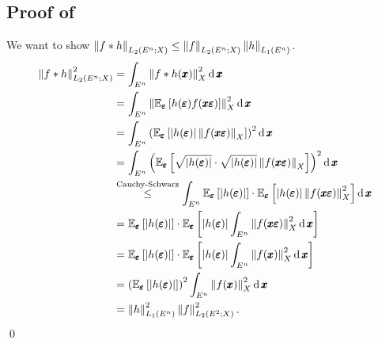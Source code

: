 \subsection{Proof of }\label{proof:1}
We want to show $\displaystyle \left\lVert f\ast h \right\rVert_{L_{2}(E^{n};X)} \le \left\lVert f \right\rVert_{L_{2}(E^{n};X)}\left\lVert h \right\rVert_{L_{1}(E^{n})}$.
\begin{align*}
\left\lVert f\ast h \right\rVert_{L_{2}(E^{n};X)}^{2} &= \int_{E^{n}} \left\lVert f\ast h(\pmb x) \right\rVert_{X}^{2}\operatorname{d}\pmb x\\
&= \int_{E^{n}} \left\lVert \mathbb E_{\pmb{\varepsilon}}\left[h(\pmb{\varepsilon})f(\pmb x\pmb{\varepsilon})\right] \right\rVert_{X}^{2}\operatorname{d}\pmb x\\
&= \int_{E^{n}} \left(\mathbb E_{\pmb{\varepsilon}}\left[\left| h(\pmb{\varepsilon}) \right|\left\lVert f(\pmb x\pmb{\varepsilon}) \right\rVert_{X}\right]\right)^{2}\operatorname{d}\pmb x\\
&= \int_{E^{n}} \left(\mathbb E_{\pmb{\varepsilon}}\left[\sqrt{\left| h(\pmb{\varepsilon}) \right|}\cdot \sqrt{\left| h(\pmb{\varepsilon}) \right|}\left\lVert f(\pmb x\pmb{\varepsilon}) \right\rVert_{X}\right]\right)^{2}\operatorname{d}\pmb x\\
&\stackrel{\text{Cauchy-Schwarz}}{\le} 
\int_{E^{n}} \mathbb E_{\pmb{\varepsilon}}\left[\left| h(\pmb{\varepsilon}) \right|\right]\cdot \mathbb E_{\pmb{\varepsilon}}\left[\left| h(\pmb{\varepsilon}) \right|\left\lVert f(\pmb x\pmb{\varepsilon}) \right\rVert_{X}^{2}\right]\operatorname{d}\pmb x\\
&= \mathbb E_{\pmb{\varepsilon}}\left[\left| h(\pmb{\varepsilon}) \right|\right]\cdot \mathbb E_{\pmb{\varepsilon}}\left[\left| h(\pmb{\varepsilon}) \right|\int_{E^{n}}\left\lVert f(\pmb x\pmb{\varepsilon}) \right\rVert_{X}^{2}\operatorname{d}\pmb x\right]\\
&= \mathbb E_{\pmb{\varepsilon}}\left[\left| h(\pmb{\varepsilon}) \right|\right]\cdot \mathbb E_{\pmb{\varepsilon}}\left[\left| h(\pmb{\varepsilon}) \right|\int_{E^{n}}\left\lVert f(\pmb x) \right\rVert_{X}^{2}\operatorname{d}\pmb x\right]\\
&= \left(\mathbb E_{\pmb{\varepsilon}}\left[\left| h(\pmb{\varepsilon}) \right|\right]\right)^{2} \int_{E^{n}}\left\lVert f(\pmb x) \right\rVert_{X}^{2}\operatorname{d}\pmb x\\
&= \left\lVert h \right\rVert_{L_{1}(E^{n})}^{2} \left\lVert f \right\rVert_{L_{2}(E^{2};X)}^{2}.
\end{align*}\hfill\qed

